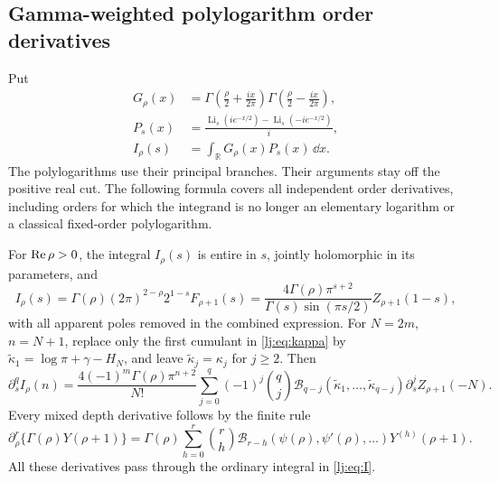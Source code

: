 \subsection{Gamma-weighted polylogarithm order derivatives}

Put
\begin{align}
 G_\rho(x)&=
   \Gamma\left(\frac\rho2+\frac{ix}{2\pi}\right)
   \Gamma\left(\frac\rho2-\frac{ix}{2\pi}\right),\nonumber\\
 P_s(x)&=\frac{\operatorname{Li}_s(ie^{-x/2})
                    -\operatorname{Li}_s(-ie^{-x/2})}{i},\nonumber\\
 I_\rho(s)&=\int_{\mathbb R}G_\rho(x)P_s(x)\,\dd x.
 \label{lj:eq:I}
\end{align}
The polylogarithms use their principal branches. Their arguments stay
off the positive real cut. The following formula covers all independent
order derivatives, including orders for which the integrand is no longer
an elementary logarithm or a classical fixed-order polylogarithm.

\begin{theorem}
\label{lj:thm:polylog}
For $\operatorname{Re}\rho>0$, the integral $I_\rho(s)$ is entire in $s$, jointly
holomorphic in its parameters, and
\begin{equation}
 I_\rho(s)=\Gamma(\rho)(2\pi)^{2-\rho}2^{1-s}F_{\rho+1}(s)
 =\frac{4\Gamma(\rho)\pi^{s+2}}
        {\Gamma(s)\sin(\pi s/2)}Z_{\rho+1}(1-s),
 \label{lj:eq:Imaster}
\end{equation}
with all apparent poles removed in the combined expression.
For $N=2m$, $n=N+1$, replace only the first cumulant in
\eqref{lj:eq:kappa} by
$\widetilde\kappa_1=\log\pi+\gamma-H_N$, and leave
$\widetilde\kappa_j=\kappa_j$ for $j\geq2$. Then
\begin{equation}
 \partial_s^qI_\rho(n)=
 \frac{4(-1)^m\Gamma(\rho)\pi^{n+2}}{N!}
   \sum_{j=0}^q(-1)^j\binom qj
    \mathcal B_{q-j}(\widetilde\kappa_1,\ldots,
                    \widetilde\kappa_{q-j})
    \partial_s^jZ_{\rho+1}(-N).
 \label{lj:eq:Ijets}
\end{equation}
Every mixed depth derivative follows by the finite rule
\begin{equation}
 \partial_\rho^r\{\Gamma(\rho)Y(\rho+1)\}
 =\Gamma(\rho)\sum_{h=0}^r\binom rh
     \mathcal B_{r-h}(\psi(\rho),\psi'(\rho),\ldots)
     Y^{(h)}(\rho+1).
 \label{lj:eq:Igammajets}
\end{equation}
All these derivatives pass through the ordinary integral in
\eqref{lj:eq:I}.
\end{theorem}

